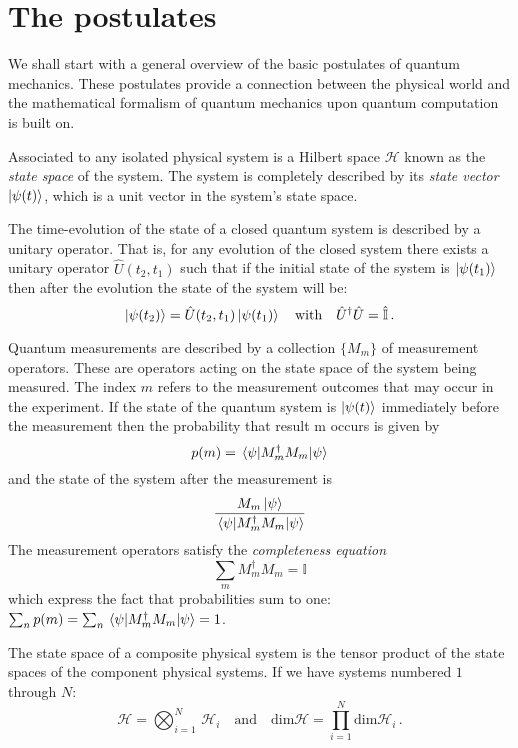 \section{The postulates}
We shall start with a general overview of the basic postulates of quantum mechanics. These postulates provide a connection between the physical world and the mathematical formalism of quantum mechanics upon quantum computation is built on.
\begin{postulate}\label{postulate:1}
Associated to any isolated physical system is a Hilbert space $\mathcal{H}$ known as the \emph{state space} of the
system. The system is completely described by its \emph{state vector} $\ket{\psi(t)}$, which is a unit
vector in the system’s state space.
\end{postulate}
\begin{postulate}\label{postulate:2}
The time-evolution of the state of a closed quantum system is described by a
unitary operator. That is, for any evolution of the closed system there exists
a unitary operator $\widehat{U}(t_2,t_1)$ such that if the initial state of the system is $\ket{\psi(t_1)}$ then
after the evolution the state of the system will be:
\begin{equation*}
    \ket{\psi(t_2)} = \hat{U}(t_2,t_1) \ket{\psi(t_1)} \quad \text{with} \quad \hat{U}^\dagger\hat{U} = \hat{\mathbb{I}}\,.
\end{equation*}
\end{postulate}
\begin{postulate}
Quantum measurements are described by a collection $\{M_m\}$ of
measurement operators. These are operators acting on the state space of the
system being measured. The index $m$ refers to the measurement outcomes that
may occur in the experiment. If the state of the quantum system is $\ket{\psi(t)}$
immediately before the measurement then the probability that result m occurs is given by
\begin{equation*}
    p(m) = \expval{M^\dagger_m M_m}{\psi}
\end{equation*}
and the state of the system after the measurement is
\begin{equation*}
    \frac{M_m\ket{\psi}}{\expval{M^\dagger_m M_m}{\psi}}
\end{equation*}
The measurement operators satisfy the \emph{completeness equation}
\begin{equation*}
    \sum_m M_m^\dagger M_m = \mathbb{I}
\end{equation*}
which express the fact that probabilities sum to one: $\sum_n p(m) = \sum_n \expval{M^\dagger_m M_m}{\psi} = 1$.
\end{postulate}
\begin{postulate}\label{postulate:4}
The state space of a composite physical system is the tensor product
of the state spaces of the component physical systems. If we have systems numbered $1$ through $N$:
\begin{equation*}
   \mathcal{H} = \bigotimes_{i=1}^{N}\,\mathcal{H}_i \quad  \text{and} \quad \text{dim}\mathcal{H} = \prod_{i=1}^N \text{dim}\mathcal{H}_i\,.
\end{equation*}
\end{postulate}